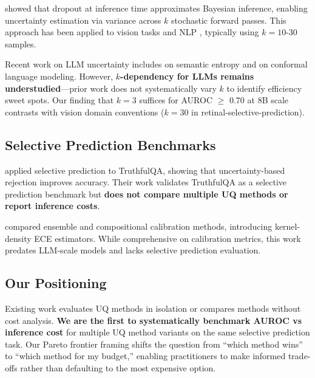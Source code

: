\cite{gal2016dropout} showed that dropout at inference time approximates Bayesian inference, enabling uncertainty estimation via variance across $k$ stochastic forward passes. This approach has been applied to vision tasks \cite{kendall2017uncertainties} and NLP \cite{xiao2019quantifying}, typically using $k=10$-30 samples.

Recent work on LLM uncertainty includes \cite{kuhn2023semantic} on semantic entropy and \cite{lin2023conformal} on conformal language modeling. However, \textbf{$k$-dependency for LLMs remains understudied}---prior work does not systematically vary $k$ to identify efficiency sweet spots. Our finding that $k=3$ suffices for AUROC $\geq$ 0.70 at 8B scale contrasts with vision domain conventions ($k=30$ in retinal-selective-prediction).

\subsection{Selective Prediction Benchmarks}

\cite{yang2023selective} applied selective prediction to TruthfulQA, showing that uncertainty-based rejection improves accuracy. Their work validates TruthfulQA as a selective prediction benchmark but \textbf{does not compare multiple UQ methods or report inference costs}.

\cite{zhang2020calibration} compared ensemble and compositional calibration methods, introducing kernel-density ECE estimators. While comprehensive on calibration metrics, this work predates LLM-scale models and lacks selective prediction evaluation.

\subsection{Our Positioning}

Existing work evaluates UQ methods in isolation or compares methods without cost analysis. \textbf{We are the first to systematically benchmark AUROC vs inference cost} for multiple UQ method variants on the same selective prediction task. Our Pareto frontier framing shifts the question from ``which method wins'' to ``which method for my budget,'' enabling practitioners to make informed trade-offs rather than defaulting to the most expensive option.
